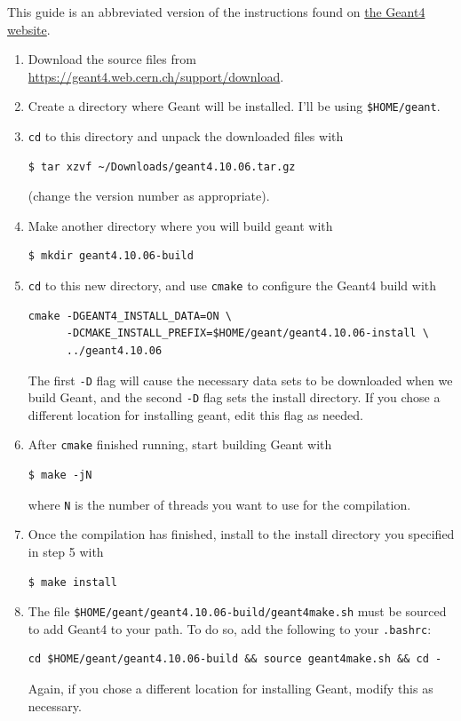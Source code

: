 \documentclass[12pt]{article}
\begin{document}
This guide is an abbreviated version of the instructions found on \href{http://geant4-userdoc.web.cern.ch/geant4-userdoc/UsersGuides/InstallationGuide/html/}{the Geant4 website}.
\begin{enumerate}
\item
Download the source files from \url{https://geant4.web.cern.ch/support/download}.

\item
Create a directory where Geant will be installed.  I'll be using \texttt{\$HOME/geant}.

\item
\texttt{cd} to this directory and unpack the downloaded files with
\begin{verbatim}
$ tar xzvf ~/Downloads/geant4.10.06.tar.gz
\end{verbatim}
(change the version number as appropriate).

\item
Make another directory where you will build geant with
\begin{verbatim}
$ mkdir geant4.10.06-build
\end{verbatim}

\item
\texttt{cd} to this new directory, and use \texttt{cmake} to configure the Geant4 build with
\begin{verbatim}
cmake -DGEANT4_INSTALL_DATA=ON \
      -DCMAKE_INSTALL_PREFIX=$HOME/geant/geant4.10.06-install \
      ../geant4.10.06
\end{verbatim}
The first \texttt{-D} flag will cause the necessary data sets to be downloaded when we build Geant, and the second \texttt{-D} flag sets the install directory.
If you chose a different location for installing geant, edit this flag as needed.

\item
After \texttt{cmake} finished running, start building Geant with
\begin{verbatim}
$ make -jN
\end{verbatim}
where \texttt{N} is the number of threads you want to use for the compilation.

\item
Once the compilation has finished, install to the install directory you specified in step 5 with
\begin{verbatim}
$ make install
\end{verbatim}

\item
The file \texttt{\$HOME/geant/geant4.10.06-build/geant4make.sh} must be sourced to add Geant4 to your path.
To do so, add the following to your \texttt{.bashrc}:
\begin{verbatim}
cd $HOME/geant/geant4.10.06-build && source geant4make.sh && cd -
\end{verbatim}
Again, if you chose a different location for installing Geant, modify this as necessary.

\end{enumerate}
\end{document}
